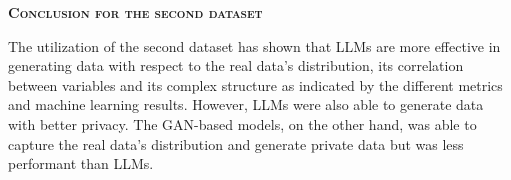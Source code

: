 \vspace{1cm}

\noindent \textsc{ \textbf{Conclusion for the second dataset}}

The utilization of the second dataset has shown that LLMs are more effective in generating data with respect to the real data's distribution, its correlation between variables and its complex structure as indicated by the different metrics and machine learning results. However, LLMs were also able to generate data with better privacy. The GAN-based models, on the other hand, was able to capture the real data's distribution and generate private data but was less performant than LLMs. 




\vspace{10cm}




